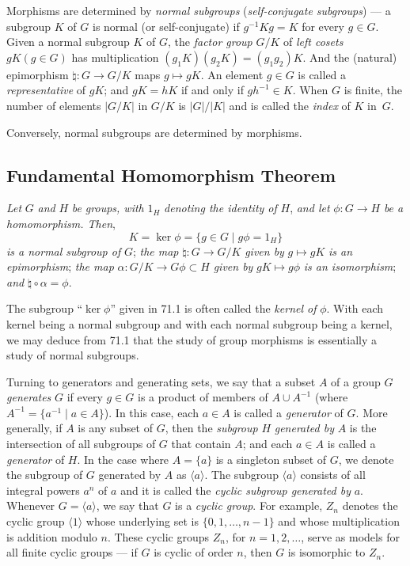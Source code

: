 \documentclass{surv-l}
\numberwithin{equation}{section}
\numberwithin{table}{section}
\numberwithin{figure}{section}
\theoremstyle{plain}
\theoremstyle{definition}
\begin{document}
Morphisms are determined by \emph{normal subgroups}
(\emph{self-conjugate subgroups}) --- a subgroup $K$ of $G$ is
normal (or self-conjugate) if $g^{-1}Kg=K$ for every $g\in G$.
Given a normal subgroup $K$ of $G$, the \emph{factor
group} $G/K$ of \emph{left cosets} $gK(g\in G)$ has multiplication
$(g_{1}K)(g_{2}K)=(g_{1}g_{2}) K$. And the (natural) epimorphism
$\natural : G\rightarrow G/K$ maps $g\mapsto gK$. An element
$g\in G$ is called a \emph{representative} of $gK$; and $gK=hK$ if and only if $ gh^{-1}\in K$. When
$G$ is finite, the number of elements $|G/K|$ in $G/K$ is
$|G|/|K|$ and is called the \emph{index} of $K$ in~$G$.

Conversely, normal subgroups are determined by morphisms.

\subsection{Fundamental Homomorphism Theorem}

\emph{Let} $G$ \emph{and} $H$ \emph{be groups, with} $1_{H}$
\emph{denoting the identity of} $H$, \emph{and let} $\phi :
G\rightarrow H$ \emph{be a homomorphism. Then},
\[
K=\ker \phi=\{g\in G\mid g\phi=1_{H}\}
\]
\emph{is a normal subgroup of} $G$; \emph{the map}
$\natural : G\rightarrow G/K$ \emph{given by} $g\mapsto gK$
\emph{is an epimorphism}; \emph{the map} $\alpha : G/K\rightarrow
G\phi\subset H$ \emph{given by} $gK\mapsto g\phi$ \emph{is an
isomorphism}; \emph{and} $\natural \circ \alpha=\phi$.

The subgroup ``$\ker \phi$'' given in 71.1 is often
called the \emph{kernel of} $\phi$. With each kernel being a
normal subgroup and with each normal subgroup being a kernel, we
may deduce from 71.1 that the study of group morphisms is
essentially a study of normal subgroups.

Turning to generators and generating sets, we say that a subset $A$
of a group $G$ \emph{generates} $G$ if every $g\in G$ is a product
of members of $A\cup A^{-1}$ (where $A^{-1}=\{a^{-1}\mid a\in
A\}$). In this case, each $a\in A$ is called a
\emph{generator} of $G$. More
generally, if $A$ is any subset of $G$, then the \emph{subgroup}
$H$ \emph{generated by} $A$ is the intersection of all subgroups
of $G$ that contain $A$; and each $a\in A$ is called a
\emph{generator} of $H$. In the case where $A=\{a\}$ is a singleton
subset of $G$, we denote the subgroup of $G$ generated by $A$ as
$\langle a\rangle$. The subgroup $\langle a\rangle$ consists of
all integral powers $a^{n}$ of $a$ and it is called the \emph{cyclic
subgroup generated by} $a$. Whenever $G=\langle a\rangle$, we say
that $G$ is a \emph{cyclic group}. For example, $Z_{n}$ denotes
the cyclic group $\langle 1\rangle$ whose underlying set is
$\{0,1,\ldots, n-1\}$ and whose multiplication is addition modulo
$n$. These cyclic groups $Z_{n}$, for $n =1,2, \ldots$, serve as
models for all finite cyclic groups --- if $G$ is cyclic of order
$n$, then $G$ is isomorphic to $Z_{n}$.
\end{document}
